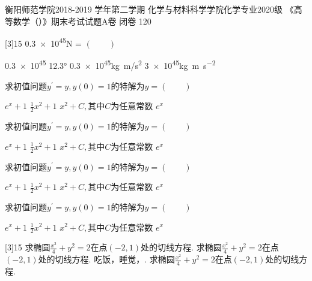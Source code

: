 \documentclass[addtable,answer,twoside,12pt]{hnuexam}
\begin{document}
\examinformation%
{衡阳师范学院2018-2019 学年第二学期}%
{化学与材料科学学院化学专业2020级}%
{《高等数学（）》期末考试试题A卷}%
{闭卷}%
{120}%

\vspace{-1.2em}

\sectiongradetable

\begin{questions}
	{15}
	\question
	\num{.3e45}\si{\newton} = \hfill $(\qquad)$

	\begin{oneparchoices}
		\choice \num{.3e45}
		\choice	\ang{12.3}
		\CorrectChoice \num{.3e45}\si{kg.m/s^2}
		\choice \num{3e45}\si{\kilo\gram\metre\per\square\second}
	\end{oneparchoices}

	\question
		求初值问题$y^\prime=y,y(0)=1$的特解为$y=$\hfill $(\qquad)$
	
		\begin{oneparchoices}
			\choice $e^x+1$
			\choice	$\frac{1}{2}x^2+1$
			\choice $x^2+C,\text{其中}C$为任意常数
			\CorrectChoice $e^x$
		\end{oneparchoices}

\question
	求初值问题$y^\prime=y,y(0)=1$的特解为$y=$\hfill $(\qquad)$

	\begin{oneparchoices}
		\choice $e^x+1$
		\choice	$\frac{1}{2}x^2+1$
		\choice $x^2+C,\text{其中}C$为任意常数
		\CorrectChoice $e^x$
	\end{oneparchoices}


\question
	求初值问题$y^\prime=y,y(0)=1$的特解为$y=$\hfill $(\qquad)$

	\begin{oneparchoices}
		\choice $e^x+1$
		\choice	$\frac{1}{2}x^2+1$
		\choice $x^2+C,\text{其中}C$为任意常数
		\CorrectChoice $e^x$
	\end{oneparchoices}


	\question
		求初值问题$y^\prime=y,y(0)=1$的特解为$y=$\hfill $(\qquad)$
	
		\begin{oneparchoices}
			\choice $e^x+1$
			\choice	$\frac{1}{2}x^2+1$
			\choice $x^2+C,\text{其中}C$为任意常数
			\CorrectChoice $e^x$
		\end{oneparchoices}

	{15}
	\question 求椭圆$\frac{x^2}{4}+y^2=2$在点$(-2,1)$处的切线方程\fillin[$x-2y+4=0$][1.5in].
	\question 求椭圆$\frac{x^2}{4}+y^2=2$在点$(-2,1)$处的切线方程\fillin[$x-2y+4=0$][2in].
	\question 吃饭，睡觉，\fillin[打豆豆][0.5in].	
	\question 求椭圆$\frac{x^2}{4}+y^2=2$在点$(-2,1)$处的切线方程\fillin[$x-2y+4=0$][2in].
	

\end{questions}
\end{document}
